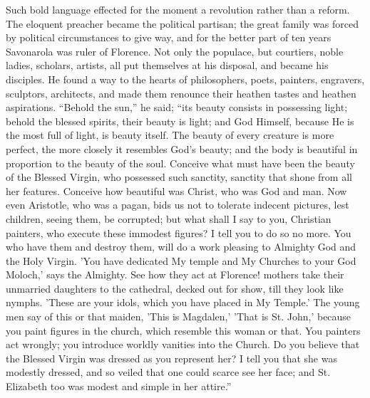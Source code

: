 Such bold language effected for the moment a
revolution rather than a reform. The eloquent preacher
became the political partisan; the great family was
forced by political circumstances to give way, and for
the better part of ten years Savonarola was ruler of
Florence. Not only the populace, but courtiers, noble
ladies, scholars, artists, all put themselves at his
disposal, and became his disciples. He found a way to the
hearts of philosophers, poets, painters, engravers,
sculptors, architects, and made them renounce their
heathen tastes and heathen aspirations. ``Behold the
sun,'' he said; ``its beauty consists in
possessing light; behold the blessed spirits, their
beauty is light; and God Himself, because He is the most
full of light, is beauty itself. The beauty of every
creature is more perfect, the more closely it resembles
God's beauty; and the body is beautiful in proportion to
the beauty of the soul. Conceive what must have been the
beauty of the Blessed Virgin, who possessed such
sanctity, sanctity that shone from all her features.
Conceive how beautiful was Christ, who was God and man.
Now even Aristotle, who was a pagan, bids us not to
tolerate indecent pictures, lest children, seeing them,
be corrupted; but what shall I say to you, Christian painters, who execute these immodest figures? I tell you
to do so no more. You who have them and destroy them,
will do a work pleasing to Almighty God and the Holy
Virgin. 'You have dedicated My temple and My Churches to
your God Moloch,' says the Almighty. See how they act at
Florence! mothers take their unmarried daughters to the
cathedral, decked out for show, till they look like
nymphs. 'These are your idols, which you have placed in
My Temple.' The young men say of this or that maiden,
'This is Magdalen,' 'That is St. John,' because you paint
figures in the church, which resemble this woman or that.
You painters act wrongly; you introduce worldly vanities
into the Church. Do you believe that the Blessed Virgin
was dressed as you represent her? I tell you that she was
modestly dressed, and so veiled that one could scarce see
her face; and St. Elizabeth too was modest and simple in
her attire.'' 

